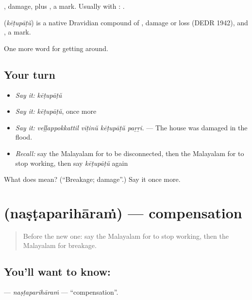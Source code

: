 , damage, plus , a mark. Usually with :  .

\begin{cousinweb}
\textbf{} (\emph{kēṭupāṭŭ}) is a native Dravidian compound of , damage or loss (DEDR 1942), and , a mark.
\end{cousinweb}

\begin{grammarlens}[title={What you've built}]
One more word for getting around.
\end{grammarlens}

\subsection*{Your turn}
\begin{itemize}
\raggedright
  \item \emph{Say it:} \emph{kēṭupāṭŭ}
  \item \emph{Say it:} \emph{kēṭupāṭŭ}, once more
  \item \emph{Say it:} \emph{veḷḷappokkattil vīṭinŭ kēṭupāṭŭ paṟṟi.} — The house was damaged in the flood.
  \item \emph{Recall:} say the Malayalam for to be disconnected, then the Malayalam for to stop working, then say \emph{kēṭupāṭŭ} again
\end{itemize}

\begin{tcolorbox}[breakable,colback=teal!4,colframe=teal!35!black,title={Before you move on}]
What does  mean? (\textquotedblleft{}Breakage; damage\textquotedblright{}.) Say it once more.
\end{tcolorbox}
\section[\texorpdfstring{\ml{നഷ്ടപരിഹാരം} (naṣṭaparihāraṁ)}{നഷ്ടപരിഹാരം (naṣṭaparihāraṁ)}]{ (naṣṭaparihāraṁ) — compensation}

\label{lesson:ML-C515-nastapariharam}



\begin{quote}
Before the new one: say the Malayalam for to stop working, then the Malayalam for breakage.
\end{quote}

\subsection*{You'll want to know: }
\textbf{} — \emph{naṣṭaparihāraṁ} — \textquotedblleft{}compensation\textquotedblright{}.

